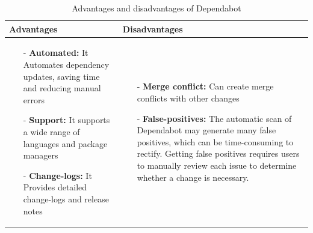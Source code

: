 \begin{table}[H]
\centering
\begin{tabular}{|>{\raggedright\arraybackslash}p{6cm}|>{\raggedright\arraybackslash}p{6cm}|}
\hline
\textbf{Advantages} & \textbf{Disadvantages} \\
\hline
\begin{itemize}
\item [-]\textbf{Automated:} It Automates dependency updates, saving time and reducing manual errors 
\vspace{5pt}
\item [-] \textbf{Support:} It supports a wide range of languages and package managers 
\vspace{5pt}
\item [-]\textbf{Change-logs:} It Provides detailed change-logs and release notes 
\end{itemize}
&
\begin{itemize}
\item [-] \textbf{Merge conflict:} Can create merge conflicts with other changes
\vspace{5pt}
\item [-] \textbf{False-positives:} The automatic scan of Dependabot may generate many false positives, which can be time-consuming to rectify. Getting false positives requires users to manually review each issue to determine whether a change is necessary. 

\end{itemize}
\\
\hline
\end{tabular}
\caption{Advantages and disadvantages of Dependabot}
\label{tab:dependabot}
\end{table}

